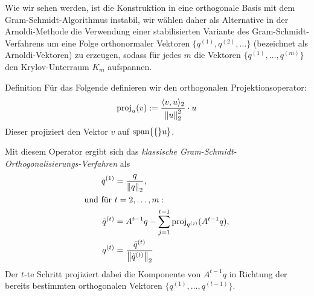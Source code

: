 Wie wir sehen werden, ist die Konstruktion in eine orthogonale Basis mit dem Gram-Schmidt-Algorithmus instabil, 
wir wählen daher als Alternative in der Arnoldi-Methode die Verwendung einer stabilisierten Variante des 
Gram-Schmidt-Verfahrens um eine Folge orthonormaler Vektoren $\{q^{(1)},q^{(2)},\dots\}$ (bezeichnet als 
Arnoldi-Vektoren) zu erzeugen, sodass für jedes $m$ die Vektoren $\{q^{(1)},\dots,q^{(m)}\}$ den Krylov-Unterraum $K_m$ 
aufspannen. 

\begin{colbox}{Definition}
Für das Folgende definieren wir den orthogonalen Projektionsoperator:
%
\begin{align*}
  \text{proj}_u(v) 
  := \dfrac{\langle v,u\rangle_2}{\vertn{2}{u}_2^2}\cdot u
\end{align*}
%
Dieser projiziert den Vektor $v$ auf $\text{span}\{\{\}u\}$.
\end{colbox}

Mit diesem Operator ergibt sich das \textit{klassische Gram-Schmidt-Orthogonalisierungs-Verfahren} als 
%
\begin{align*}
  q^{(1)} 
  &= \dfrac{q}{\vertn{2}{q}_2}, \\
  \text{und für } &t=2,\dots,m: \\
  \tilde{q}^{(t)} 
  &= A^{t-1}q - \sum_{j=1}^{t-1} \text{proj}_{q^{(j)}}(A^{t-1}q), 
  \\
  q^{(t)} 
  &= \dfrac{\tilde{q}^{(t)}}{\vertn{2}{\tilde{q}^{(t)}}_2}
\end{align*}
%
Der $t$-te Schritt projiziert dabei die Komponente von $A^{t-1}q$ in Richtung der bereits bestimmten orthogonalen 
Vektoren $\{q^{(1)},\dots,q^{(t-1)}\}$. 

